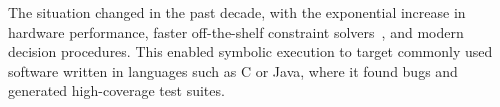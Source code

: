 The situation changed in the past decade, with the exponential increase in hardware performance, faster off-the-shelf constraint solvers~\cite{chaff,minisat,stp,Z3,cvc}, and modern decision procedures.
%
This enabled symbolic execution to target commonly used software written in languages such as C or Java, where it found bugs and generated high-coverage test suites.











